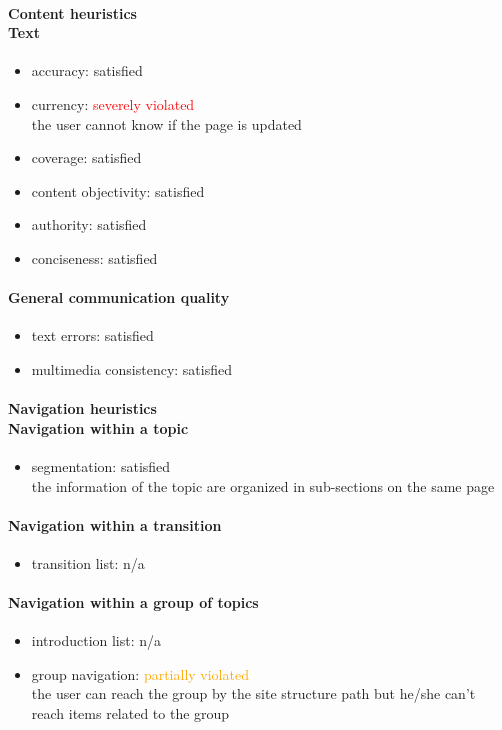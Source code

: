 \begin{enumerate}
	\paragraph*{Content heuristics \\ Text}
	\begin{itemize}
		\item accuracy: satisfied
		\item currency: \textcolor{red}{severely violated}\\
		the user cannot know if the page is updated
		\item coverage: satisfied
		\item content objectivity: satisfied
		\item authority: satisfied
		\item conciseness: satisfied		
	\end{itemize}
	
	\paragraph*{General communication quality}
	\begin{itemize}
		\item text errors: satisfied
		\item multimedia consistency: satisfied
	\end{itemize}
	
	\paragraph*{Navigation heuristics \\ Navigation within a topic}
	\begin{itemize}
		\item segmentation: satisfied\\
		the information of the topic are organized in sub-sections on the same page 
	\end{itemize}	
	
	\paragraph*{Navigation within a transition}
	\begin{itemize}
		\item transition list: n/a
	\end{itemize}
	
	\paragraph*{Navigation within a group of topics}
	\begin{itemize}
		\item introduction list: n/a
		\item group navigation: \textcolor{orange}{partially violated}\\
		the user can reach the group by the site structure path but he/she can't reach items related to the group
	\end{itemize}
	

\end{enumerate}
